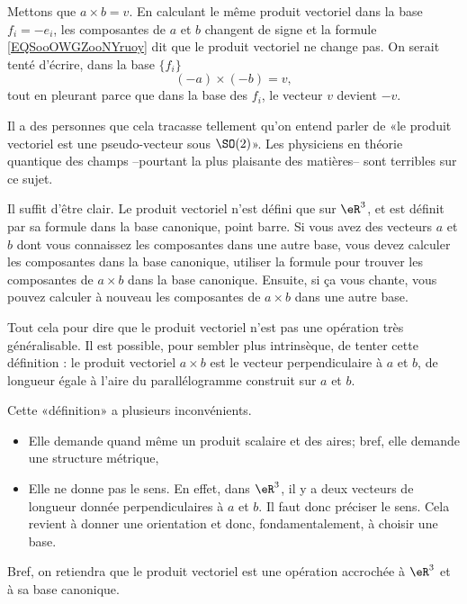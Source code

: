 \begin{normaltext}
    Mettons que \( a\times b=v\). En calculant le même produit vectoriel dans la base \( f_i=-e_i\), les composantes de \( a\) et \( b\) changent de signe et la formule \eqref{EQSooOWGZooNYruoy} dit que le produit vectoriel ne change pas. On serait tenté d'écrire, dans la base \( \{ f_i \}\)
    \begin{equation}
        (-a)\times (-b)=v,
    \end{equation}
    tout en pleurant parce que dans la base des \( f_i\), le vecteur \( v\) devient \( -v\).

    Il a des personnes que cela tracasse tellement qu'on entend parler de «le produit vectoriel est une pseudo-vecteur sous \( \SO(2)\)». Les physiciens en théorie quantique des champs --pourtant la plus plaisante des matières-- sont terribles sur ce sujet.

    Il suffit d'être clair. Le produit vectoriel n'est défini que sur \( \eR^3\), et est définit par sa formule dans la base canonique, point barre. Si vous avez des vecteurs \( a\) et \( b\) dont vous connaissez les composantes dans une autre base, vous devez calculer les composantes dans la base canonique, utiliser la formule pour trouver les composantes de \( a\times b\) dans la base canonique. Ensuite, si ça vous chante, vous pouvez calculer à nouveau les composantes de \( a\times b\) dans une autre base.

    Tout cela pour dire que le produit vectoriel n'est pas une opération très généralisable. Il est possible, pour sembler plus intrinsèque, de tenter cette définition : le produit vectoriel \( a\times b\) est le vecteur perpendiculaire à \( a\) et \( b\), de longueur égale à l'aire du parallélogramme construit sur \( a\) et \( b\).

    Cette «définition» a plusieurs inconvénients.
    \begin{itemize}
        \item Elle demande quand même un produit scalaire et des aires; bref, elle demande une structure métrique,
        \item Elle ne donne pas le sens. En effet, dans \( \eR^3\), il y a deux vecteurs de longueur donnée perpendiculaires à \( a\) et \( b\). Il faut donc préciser le sens. Cela revient à donner une orientation et donc, fondamentalement, à choisir une base.
    \end{itemize}
    
    Bref, on retiendra que le produit vectoriel est une opération accrochée à \( \eR^3\) et à sa base canonique.
\end{normaltext}

